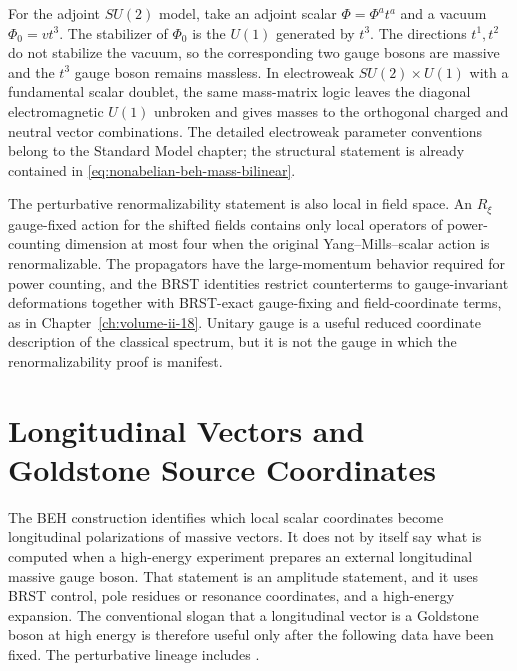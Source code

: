 For the adjoint \(SU(2)\) model, take an adjoint scalar
\(\Phi=\Phi^a t^a\) and a vacuum \(\Phi_0=v t^3\).  The stabilizer of
\(\Phi_0\) is the \(U(1)\) generated by \(t^3\).  The directions \(t^1,t^2\)
do not stabilize the vacuum, so the corresponding two gauge bosons are
massive and the \(t^3\) gauge boson remains massless.  In electroweak
\(SU(2)\times U(1)\) with a fundamental scalar doublet, the same mass-matrix
logic leaves the diagonal electromagnetic \(U(1)\) unbroken and gives masses
to the orthogonal charged and neutral vector combinations.  The detailed
electroweak parameter conventions belong to the Standard Model chapter; the
structural statement is already contained in
\eqref{eq:nonabelian-beh-mass-bilinear}.

The perturbative renormalizability statement is also local in field space.
An \(R_\xi\) gauge-fixed action for the shifted fields contains only local
operators of power-counting dimension at most four when the original
Yang--Mills--scalar action is renormalizable.  The propagators have the
large-momentum behavior required for power counting, and the BRST identities
restrict counterterms to gauge-invariant deformations together with
BRST-exact gauge-fixing and field-coordinate terms, as in
Chapter~\ref{ch:volume-ii-18}.  Unitary gauge is a useful reduced coordinate
description of the classical spectrum, but it is not the gauge in which the
renormalizability proof is manifest.

\section{Longitudinal Vectors and Goldstone Source Coordinates}
\label{sec:longitudinal-goldstone-equivalence}

The BEH construction identifies which local scalar coordinates become
longitudinal polarizations of massive vectors.  It does not by itself say what
is computed when a high-energy experiment prepares an external longitudinal
massive gauge boson.  That statement is an amplitude statement, and it uses
BRST control, pole residues or resonance coordinates, and a high-energy
expansion.  The conventional slogan that a longitudinal vector is a Goldstone
boson at high energy is therefore useful only after the following data have
been fixed.  The perturbative lineage includes
\cite{CornwallLevinTiktopoulos1974,LeeQuiggThacker1977,
ChanowitzGaillard1985,Veltman1990EquivalenceTheorem,BaggerSchmidt1990}.

